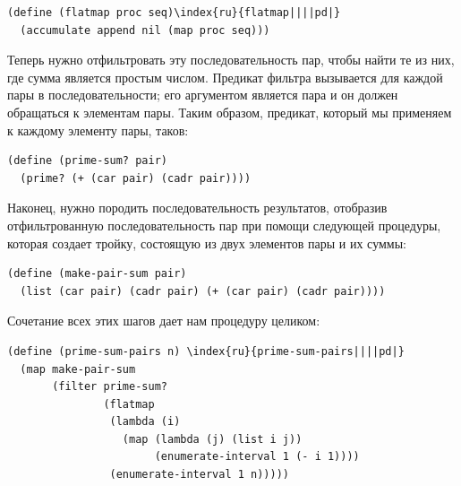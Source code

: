\begin{Verbatim}[fontsize=\small]
(define (flatmap proc seq)\index{ru}{flatmap||||pd|}
  (accumulate append nil (map proc seq)))
\end{Verbatim}
Теперь нужно отфильтровать эту последовательность пар, чтобы найти те
из них, где сумма является простым числом.  Предикат фильтра
вызывается для каждой пары в последовательности; его аргументом
является пара и он должен обращаться к элементам пары. Таким образом,
предикат, который мы применяем к каждому элементу пары, таков:

\begin{Verbatim}[fontsize=\small]
(define (prime-sum? pair)
  (prime? (+ (car pair) (cadr pair))))
\end{Verbatim}
Наконец, нужно породить последовательность результатов, отобразив
от\-фи\-льтро\-ван\-ную последовательность пар при помощи следующей процедуры, 
которая создает тройку, состоящую из двух элементов пары и их суммы:

\begin{Verbatim}[fontsize=\small]
(define (make-pair-sum pair)
  (list (car pair) (cadr pair) (+ (car pair) (cadr pair))))
\end{Verbatim}
Сочетание всех этих шагов дает нам процедуру целиком:

\begin{Verbatim}[fontsize=\small]
(define (prime-sum-pairs n) \index{ru}{prime-sum-pairs||||pd|}
  (map make-pair-sum
       (filter prime-sum?
               (flatmap
                (lambda (i)
                  (map (lambda (j) (list i j))
                       (enumerate-interval 1 (- i 1))))
                (enumerate-interval 1 n)))))
\end{Verbatim}


